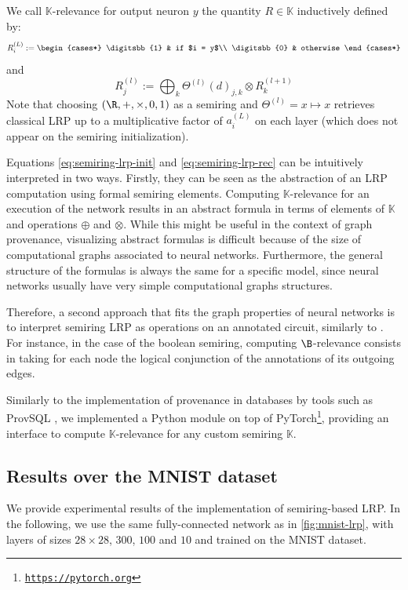\documentclass{../cs-classes/cs-classes}
\newcommand*{\K}{\mathbb{K}}
\newcommand*{\1}{\digitsbb{1}}
\newcommand*{\0}{\digitsbb{0}}
\begin{document}
We call $\K$-relevance for output neuron $y$ the quantity $R\in\K$ inductively defined by:
\begin{equation}
    R^{(L)}_i := \begin{cases*}
        \1 & if $i = y$\\
        \0 & otherwise
    \end{cases*}
    \label{eq:semiring-lrp-init}
\end{equation}
and
\begin{equation}
    R^{(l)}_j := \bigoplus_{k}\Theta^{(l)}(d)_{j,k} \otimes R^{(l+1)}_k
    \label{eq:semiring-lrp-rec}
\end{equation}
Note that choosing $(\R,+,\times,0,1)$ as a semiring and $\Theta^{(l)}=x\mapsto x$ retrieves classical LRP up to a multiplicative factor of $a_i^{(L)}$ on each layer (which does not appear on the semiring initialization).

Equations \ref{eq:semiring-lrp-init} and \ref{eq:semiring-lrp-rec} can be intuitively interpreted in two ways. Firstly, they can be seen as the abstraction of an LRP computation using formal semiring elements. Computing $\K$-relevance for an execution of the network results in an abstract formula in terms of elements of $\K$ and operations $\oplus$ and $\otimes$. While this might be useful in the context of graph provenance, visualizing abstract formulas is difficult because of the size of computational graphs associated to neural networks. Furthermore, the general structure of the formulas is always the same for a specific model, since neural networks usually have very simple computational graphs structures. 

Therefore, a second approach that fits the graph properties of neural networks is to interpret semiring LRP as operations on an annotated circuit, similarly to \cite{senellart2018provenance}. For instance, in the case of the boolean semiring, computing $\B$-relevance consists in taking for each node the logical conjunction of the annotations of its outgoing edges.

Similarly to the implementation of provenance in databases by tools such as ProvSQL \cite{provsql}, we implemented a Python module on top of PyTorch\footnote{\href{https://pytorch.org}{\texttt{https://pytorch.org}}}, providing an interface to compute $\K$-relevance for any custom semiring $\K$.


\subsection{Results over the MNIST dataset}
We provide experimental results of the implementation of semiring-based LRP. In the following, we use the same fully-connected network as in \autoref{fig:mnist-lrp}, with layers of sizes $28\times28$, $300$, $100$ and $10$ and trained on the MNIST dataset.
\end{document}
